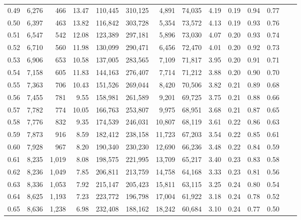 \begin{tabular}{rrrrrrrrrrrrrr}
0.49 &  6,276 &    466 &   13.47 &  110,445 &  310,125 &   4,891 &  74,035 &  4.19 &  0.19 &  0.94 &      0.77 \\
0.50 &  6,397 &    463 &   13.82 &  116,842 &  303,728 &   5,354 &  73,572 &  4.13 &  0.19 &  0.93 &      0.76 \\
0.51 &  6,547 &    542 &   12.08 &  123,389 &  297,181 &   5,896 &  73,030 &  4.07 &  0.20 &  0.93 &      0.74 \\
0.52 &  6,710 &    560 &   11.98 &  130,099 &  290,471 &   6,456 &  72,470 &  4.01 &  0.20 &  0.92 &      0.73 \\
0.53 &  6,906 &    653 &   10.58 &  137,005 &  283,565 &   7,109 &  71,817 &  3.95 &  0.20 &  0.91 &      0.71 \\
0.54 &  7,158 &    605 &   11.83 &  144,163 &  276,407 &   7,714 &  71,212 &  3.88 &  0.20 &  0.90 &      0.70 \\
0.55 &  7,363 &    706 &   10.43 &  151,526 &  269,044 &   8,420 &  70,506 &  3.82 &  0.21 &  0.89 &      0.68 \\
0.56 &  7,455 &    781 &    9.55 &  158,981 &  261,589 &   9,201 &  69,725 &  3.75 &  0.21 &  0.88 &      0.66 \\
0.57 &  7,782 &    774 &   10.05 &  166,763 &  253,807 &   9,975 &  68,951 &  3.68 &  0.21 &  0.87 &      0.65 \\
0.58 &  7,776 &    832 &    9.35 &  174,539 &  246,031 &  10,807 &  68,119 &  3.61 &  0.22 &  0.86 &      0.63 \\
0.59 &  7,873 &    916 &    8.59 &  182,412 &  238,158 &  11,723 &  67,203 &  3.54 &  0.22 &  0.85 &      0.61 \\
0.60 &  7,928 &    967 &    8.20 &  190,340 &  230,230 &  12,690 &  66,236 &  3.48 &  0.22 &  0.84 &      0.59 \\
0.61 &  8,235 &  1,019 &    8.08 &  198,575 &  221,995 &  13,709 &  65,217 &  3.40 &  0.23 &  0.83 &      0.58 \\
0.62 &  8,236 &  1,049 &    7.85 &  206,811 &  213,759 &  14,758 &  64,168 &  3.33 &  0.23 &  0.81 &      0.56 \\
0.63 &  8,336 &  1,053 &    7.92 &  215,147 &  205,423 &  15,811 &  63,115 &  3.25 &  0.24 &  0.80 &      0.54 \\
0.64 &  8,625 &  1,193 &    7.23 &  223,772 &  196,798 &  17,004 &  61,922 &  3.18 &  0.24 &  0.78 &      0.52 \\
0.65 &  8,636 &  1,238 &    6.98 &  232,408 &  188,162 &  18,242 &  60,684 &  3.10 &  0.24 &  0.77 &      0.50 \\

\end{tabular}
